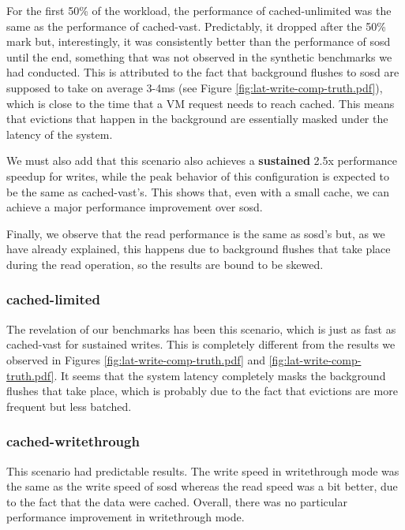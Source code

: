 For the first 50\% of the workload, the performance of cached-unlimited was the 
same as the performance of cached-vast. Predictably, it dropped after the 50\% 
mark but, interestingly, it was consistently better than the performance of 
sosd until the end, something that was not observed in the synthetic benchmarks 
we had conducted.  This is attributed to the fact that background flushes to 
sosd are supposed to take on average 3-4ms (see Figure 
\ref{fig:lat-write-comp-truth.pdf}), which is close to the time that a VM 
request needs to reach cached.  This means that evictions that happen in the 
background are essentially masked under the latency of the system.

We must also add that this scenario also achieves a \textbf{sustained} 2.5x 
performance speedup for  writes, while the peak behavior of this configuration 
is expected to be the same as cached-vast's. This shows that, even with a small 
cache, we can achieve a major performance improvement over sosd. 

Finally, we observe that the read performance is the same as sosd's but, as we 
have already explained, this happens due to background flushes that take place 
during the read operation, so the results are bound to be skewed.

\subsubsection{cached-limited}

The revelation of our benchmarks has been this scenario, which is just as fast
as cached-vast for sustained writes. This is completely different from the 
results we observed in Figures \ref{fig:lat-write-comp-truth.pdf} and 
\ref{fig:lat-write-comp-truth.pdf}. It seems that the system latency completely 
masks the background flushes that take place, which is  probably due to the 
fact that evictions are more frequent but less batched.

\subsubsection{cached-writethrough}

This scenario had predictable results. The write speed in writethrough mode was 
the same as the write speed of sosd whereas the read speed was a bit better, 
due to the fact that the data were cached. Overall, there was no particular 
performance improvement in writethrough mode.

